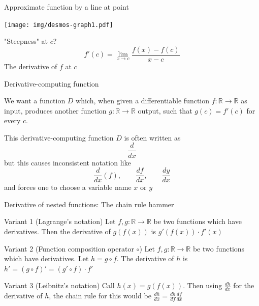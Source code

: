\documentclass[12pt,aspectratio=169,handout]{beamer}
\begin{document}
\begin{frame}{Approximate function by a line at point}
	
	
	\texttt{[image: img/desmos-graph1.pdf]}
	
	
	
	
	"Steepness" at $c$?
	$$f'(c) = \lim_{x \to c} \frac{f(x) - f(c)}{x - c}$$
	The derivative of $f$ at $c$
	
	
	
	
	
\end{frame}


\begin{frame}{Derivative-computing function}
	
	We want a function $D$ which, when given a differentiable function $f : \mathbb{R} \to \mathbb{R}$ as input, produces another function $g : \mathbb{R} \to \mathbb{R}$ output, such that $g(c) = f'(c)$ for every $c$.
	
	\bigskip
	\pause
	This derivative-computing function $D$ is often written as 
	$$\frac{d}{dx}$$
	but this causes inconsistent notation like
	$$\frac{d}{dx}(f), \qquad \frac{df}{dx}, \qquad \frac{dy}{dx}$$
	and forces one to choose a variable name $x$ or $y$
	
\end{frame}

\begin{frame}{Derivative of nested functions: The chain rule hammer}
	
	
	\begin{block}{Variant 1 (Lagrange's notation)}
		Let $f, g : \mathbb{R} \to \mathbb{R}$ be two functions which have derivatives. Then the derivative of $g (f(x))$ is $g' (f(x)) \cdot f' (x)$
	\end{block}
	\pause
	
	\begin{block}{Variant 2 (Function composition operator $\circ$)}
		Let $f, g : \mathbb{R} \to \mathbb{R}$ be two functions which have derivatives. Let $h = g \circ f$. The derivative of $h$ is $h'=(g \circ f)'=(g'\circ f)\cdot f'$
	\end{block}
	\pause
	
	\begin{block}{Variant 3 (Leibnitz's notation)}
		Call $h(x) = g(f(x))$. Then using $\frac{dh}{dx}$ for the derivative of $h$, the chain rule for this would be $\frac{dh}{dx} = \frac{dh}{df} \frac{df}{dx}$
	\end{block}
	
\end{frame}
\end{document}
